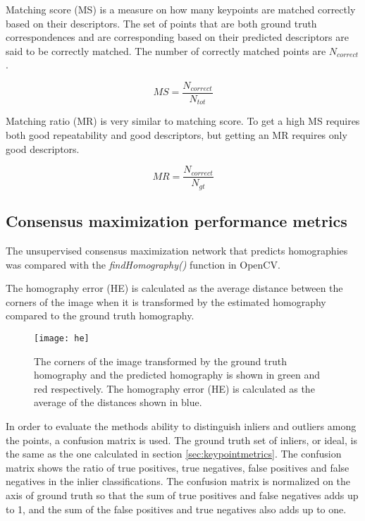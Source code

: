 Matching score (MS) is a measure on how many keypoints are matched correctly based on their descriptors. The set of points that are both ground truth correspondences and are corresponding based on their predicted descriptors are said to be correctly matched. The number of correctly matched points are $N_{correct}$.

\[
MS=\frac{N_{correct}}{N_{tot}}
\]

Matching ratio (MR) is very similar to matching score. To get a high MS requires both good repeatability and good descriptors, but getting an MR requires only good descriptors.

\[
MR=\frac{N_{correct}}{N_{gt}}
\]

\subsection{Consensus maximization performance metrics}

The unsupervised consensus maximization network that predicts homographies was compared with the \textit{findHomography()} function in OpenCV.

The homography error (HE) is calculated as the average distance between the corners of the image when it is transformed by the estimated homography compared to the ground truth homography.

\begin{figure}[H]
	\centering
	\texttt{[image: he]}
	\caption{The corners of the image transformed by the ground truth homography and the predicted homography is shown in green and red respectively. The homography error (HE) is calculated as the average of the distances shown in blue.}
	\label{fig:he}
\end{figure}

In order to evaluate the methods ability to distinguish inliers and outliers among the points, a confusion matrix is used. The ground truth set of inliers, or ideal, is the same as the one calculated in section \ref{sec:keypointmetrics}. The confusion matrix shows the ratio of true positives, true negatives, false positives and false negatives in the inlier classifications. The confusion matrix is normalized on the axis of ground truth so that the sum of true positives and false negatives adds up to 1, and the sum of the false positives and true negatives also adds up to one.

